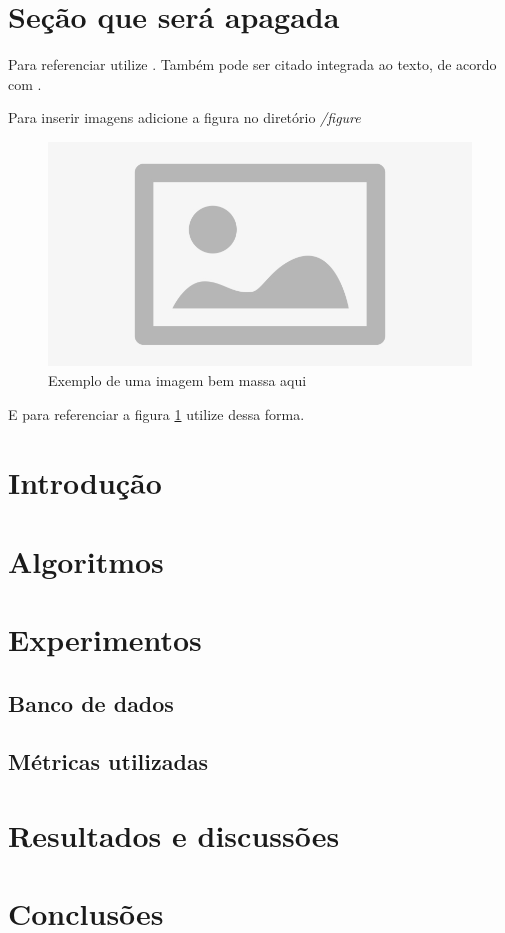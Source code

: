 \section{Seção que será apagada}

Para referenciar utilize \cite{ninguem2022curioso}. Também pode ser citado integrada ao texto, de acordo com .

Para inserir imagens adicione a figura no diretório \textit{/figure} 

\begin{figure}[htbp!]
\centering
\includegraphics[width=1\textwidth]{figure/placeholder.jpg}
\caption{Exemplo de uma imagem bem massa aqui} 
\label{fig:imagem_massa}
\end{figure}

E para referenciar a figura \ref{fig:imagem_massa} utilize dessa forma.

\section{Introdução}

\lipsum[2-4]

\section{Algoritmos}

\lipsum[2-4]

\section{Experimentos}

\lipsum[2-4]

\subsection{Banco de dados}

\lipsum[2-4]

\subsection{Métricas utilizadas}

\lipsum[2-4]

\section{Resultados e discussões}

\lipsum[2-4]

\section{Conclusões}

\lipsum[2-4]

